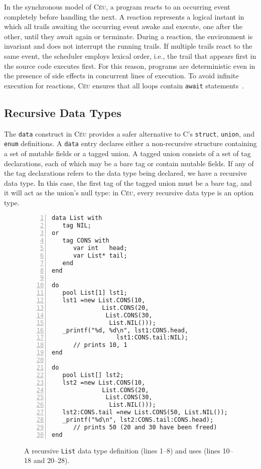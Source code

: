 \documentclass{acm_proc_article-sp}
\newcommand{\CEU}{\textsc{C\'{e}u}\xspace}
\newcommand{\code}[1] {{\small{\texttt{#1}}}}
\begin{document}
In the synchronous model of \CEU, a program reacts to an occurring event 
completely before handling the next.
%
A reaction represents a logical instant in which all trails awaiting the 
occurring event awake and execute, one after the other, until they await again 
or terminate.
%
During a reaction, the environment is invariant and does not interrupt the 
running trails.
If multiple trails react to the same event, the scheduler employs lexical 
order, i.e., the trail that appears first in the source code executes first.
%
For this reason, programs are deterministic even in the presence of side 
effects in concurrent lines of execution.
%
To avoid infinite execution for reactions, \CEU ensures that all loops contain 
\code{await} statements~\cite{ceu.sensys13}.

\subsection{Recursive Data Types}

The \code{data} construct in \CEU provides a safer alternative to C's
\code{struct}, \code{union}, and \code{enum} definitions. A \code{data} entry
declares either a non-recursive structure containing a set of mutable fields
or a tagged union. A tagged union consists of a set of tag declarations, each
of which may be a bare tag or contain mutable fields. If any of the tag
declarations refers to the data type being declared, we have a recursive data
type. In this case, the first tag of the tagged union must be a bare tag, and
it will act as the union's null type: in \CEU, every recursive data type
is an option type.

%
%
%
%
%

\begin{figure}[t]
\begin{lstlisting}[numbers=left,xleftmargin=3em]
data List with
   tag NIL;
or
   tag CONS with
      var int   head;
      var List* tail;
   end
end

do
   pool List[1] lst1;
   lst1 =new List.CONS(10,
              List.CONS(20,
               List.CONS(30,
                List.NIL()));
   _printf("%d, %d\n", lst1:CONS.head,
                  lst1:CONS.tail:NIL);
      // prints 10, 1
end

do
   pool List[] lst2;
   lst2 =new List.CONS(10,
              List.CONS(20,
               List.CONS(30,
                List.NIL()));
   lst2:CONS.tail =new List.CONS(50, List.NIL());
   _printf("%d\n", lst2:CONS.tail:CONS.head);
      // prints 50 (20 and 30 have been freed)
end
\end{lstlisting}
\caption{
A recursive \code{List} data type definition (lines 1--8) and uses (lines 
10--18 and 20--28).
\label{lst.data.list}
}
\end{figure}
\end{document}
